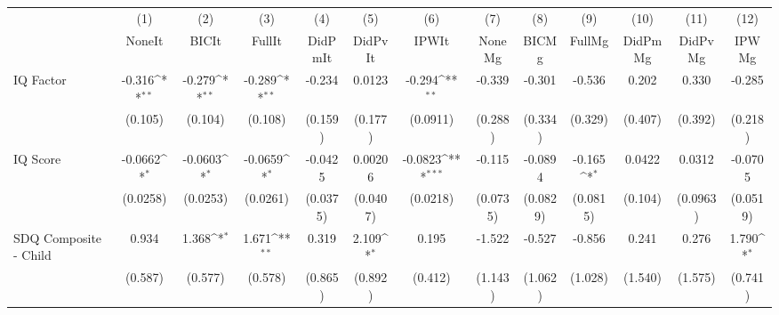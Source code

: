 {
\def\sym#1{\ifmmode^{#1}\else\(^{#1}\)\fi}
\begin{tabular}{l*{12}{c}}
\toprule
            &\multicolumn{1}{c}{(1)}&\multicolumn{1}{c}{(2)}&\multicolumn{1}{c}{(3)}&\multicolumn{1}{c}{(4)}&\multicolumn{1}{c}{(5)}&\multicolumn{1}{c}{(6)}&\multicolumn{1}{c}{(7)}&\multicolumn{1}{c}{(8)}&\multicolumn{1}{c}{(9)}&\multicolumn{1}{c}{(10)}&\multicolumn{1}{c}{(11)}&\multicolumn{1}{c}{(12)}\\
            &\multicolumn{1}{c}{NoneIt}&\multicolumn{1}{c}{BICIt}&\multicolumn{1}{c}{FullIt}&\multicolumn{1}{c}{DidPmIt}&\multicolumn{1}{c}{DidPvIt}&\multicolumn{1}{c}{IPWIt}&\multicolumn{1}{c}{NoneMg}&\multicolumn{1}{c}{BICMg}&\multicolumn{1}{c}{FullMg}&\multicolumn{1}{c}{DidPmMg}&\multicolumn{1}{c}{DidPvMg}&\multicolumn{1}{c}{IPWMg}\\
\midrule
IQ Factor   &      -0.316\sym{**} &      -0.279\sym{**} &      -0.289\sym{**} &      -0.234         &      0.0123         &      -0.294\sym{**} &      -0.339         &      -0.301         &      -0.536         &       0.202         &       0.330         &      -0.285         \\
            &     (0.105)         &     (0.104)         &     (0.108)         &     (0.159)         &     (0.177)         &    (0.0911)         &     (0.288)         &     (0.334)         &     (0.329)         &     (0.407)         &     (0.392)         &     (0.218)         \\
\addlinespace
IQ Score    &     -0.0662\sym{*}  &     -0.0603\sym{*}  &     -0.0659\sym{*}  &     -0.0425         &     0.00206         &     -0.0823\sym{***}&      -0.115         &     -0.0894         &      -0.165\sym{*}  &      0.0422         &      0.0312         &     -0.0705         \\
            &    (0.0258)         &    (0.0253)         &    (0.0261)         &    (0.0375)         &    (0.0407)         &    (0.0218)         &    (0.0735)         &    (0.0829)         &    (0.0815)         &     (0.104)         &    (0.0963)         &    (0.0519)         \\
\addlinespace
SDQ Composite - Child&       0.934         &       1.368\sym{*}  &       1.671\sym{**} &       0.319         &       2.109\sym{*}  &       0.195         &      -1.522         &      -0.527         &      -0.856         &       0.241         &       0.276         &       1.790\sym{*}  \\
            &     (0.587)         &     (0.577)         &     (0.578)         &     (0.865)         &     (0.892)         &     (0.412)         &     (1.143)         &     (1.062)         &     (1.028)         &     (1.540)         &     (1.575)         &     (0.741)         \\

\end{tabular}}
